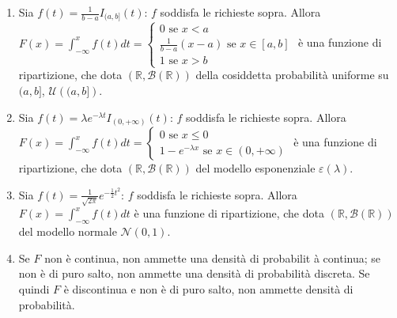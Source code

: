 \documentclass{article}
\begin{document}
\begin{enumerate}
\item Sia $f\left( t\right) =\frac{1}{b-a}I_{(a,b]}\left( t\right) $: $f$
soddisfa le richieste sopra. Allora $F\left( x\right) =\int_{-\infty
}^{x}f\left( t\right) dt=\left\{ 
\begin{array}{c}
0\text{ se }x<a \\ 
\frac{1}{b-a}\left( x-a\right) \text{ se }x\in \left[ a,b\right] \\ 
1\text{ se }x>b%
\end{array}%
\right. $ \`{e} una funzione di ripartizione, che dota $\left( 
\mathbb{R}
,\mathcal{B}\left( 
\mathbb{R}
\right) \right) $ della cosiddetta probabilit\`{a} uniforme su $(a,b]$, $%
\mathcal{U}\left( (a,b]\right) $.

\item Sia $f\left( t\right) =\lambda e^{-\lambda t}I_{\left( 0,+\infty
\right) }\left( t\right) $: $f$ soddisfa le richieste sopra. Allora $F\left(
x\right) =\int_{-\infty }^{x}f\left( t\right) dt=\left\{ 
\begin{array}{c}
0\text{ se }x\leq 0 \\ 
1-e^{-\lambda x}\text{ se }x\in \left( 0,+\infty \right)%
\end{array}%
\right. $ \`{e} una funzione di ripartizione, che dota $\left( 
\mathbb{R}
,\mathcal{B}\left( 
\mathbb{R}
\right) \right) $ del modello esponenziale $\varepsilon \left( \lambda
\right) $.

\item Sia $f\left( t\right) =\frac{1}{\sqrt{2\pi }}e^{-\frac{1}{2}t^{2}}$: $%
f $ soddisfa le richieste sopra. Allora $F\left( x\right) =\int_{-\infty
}^{x}f\left( t\right) dt$ \`{e} una funzione di ripartizione, che dota $%
\left( 
\mathbb{R}
,\mathcal{B}\left( 
\mathbb{R}
\right) \right) $ del modello normale $\mathcal{N}\left( 0,1\right) $.

\item Se $F$ non \`{e} continua, non ammette una densit\`{a} di probabilit%
\`{a} continua; se non \`{e} di puro salto, non ammette una densit\`{a} di
probabilit\`{a} discreta. Se quindi $F$ \`{e} discontinua e non \`{e} di
puro salto, non ammette densit\`{a} di probabilit\`{a}.
\end{enumerate}
\end{document}
